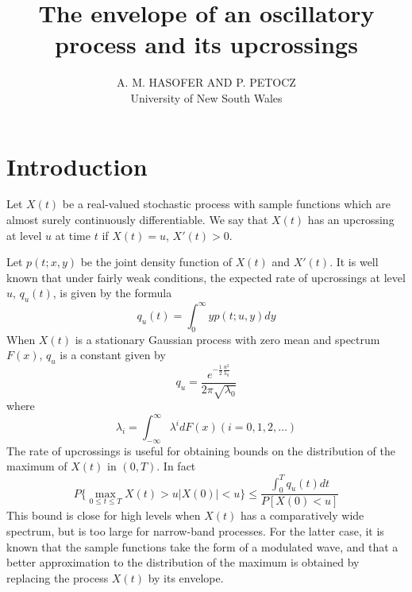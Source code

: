 \documentclass{article}
\newcommand{\tmaffiliation}[1]{\\ #1}
\begin{document}
\title{The envelope of an oscillatory process and its upcrossings}

\author{
  A. M. HASOFER AND P. PETOCZ
  \tmaffiliation{University of New South Wales}
}

\date{}

\maketitle

{\tableofcontents}

\section{Introduction}

Let $X (t)$ be a real-valued stochastic process with sample functions which
are almost surely continuously differentiable. We say that $X (t)$ has an
upcrossing at level $u$ at time $t$ if $X (t) = u$, $X' (t) > 0$.

Let $p (t ; x, y)$ be the joint density function of $X (t)$ and $X' (t)$. It
is well known that under fairly weak conditions, the expected rate of
upcrossings at level $u$, $q_u (t)$, is given by the formula
\begin{equation}
  \label{eq:expected_rate} q_u (t) = \int_0^{\infty} yp (t ; u, y) dy
\end{equation}
When $X (t)$ is a stationary Gaussian process with zero mean and spectrum $F
(x)$, $q_u$ is a constant given by
\begin{equation}
  \label{eq:stationary_gaussian} q_u = \frac{e^{- \frac{1}{2} 
  \frac{u^2}{\lambda_0}}}{2 \pi \sqrt{\lambda_0}} 
\end{equation}
where
\begin{equation}
  \label{eq:lambda_i} \lambda_i = \int_{- \infty}^{\infty} \lambda^i dF (x) (i
  = 0, 1, 2, \ldots)
\end{equation}
The rate of upcrossings is useful for obtaining bounds on the distribution of
the maximum of $X (t)$ in $(0, T)$. In fact
\begin{equation}
  \label{eq:probability_bound} P \{ \max_{0 \leq t \leq T} X (t) > u|X (0) | <
  u \} \leq \frac{\int_0^T q_u (t) dt}{P [X (0) < u]}
\end{equation}
This bound is close for high levels when $X (t)$ has a comparatively wide
spectrum, but is too large for narrow-band processes. For the latter case, it
is known that the sample functions take the form of a modulated wave, and that
a better approximation to the distribution of the maximum is obtained by
replacing the process $X (t)$ by its envelope.
\end{document}
